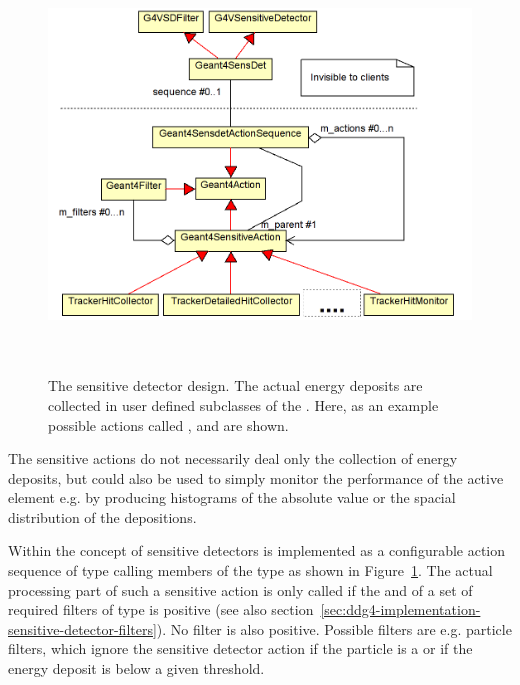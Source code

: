\documentclass[10pt,a4paper]{article}
\begin{document}
\begin{figure}[t]
  \begin{center}
    \includegraphics[height=110mm] {DDG4-Sensitive-detector.png}
    \caption{The sensitive detector design. The actual energy deposits are 
        collected in user defined subclasses of the .
        Here, as an example possible actions called ,
         and  are shown.}
    \label{fig:ddg4-implementation-sensitive-detector}
  \end{center}
\end{figure}

\noindent
The sensitive actions do not necessarily deal only the collection of energy 
deposits, but could also be used to simply monitor the performance of the
active element e.g. by producing histograms of the absolute value or the 
spacial distribution of the depositions.

\noindent
Within \DDG the concept of sensitive  detectors is implemented as a
configurable  action sequence of type 
{}
calling members of the type 
{} as shown in 
Figure~\ref{fig:ddg4-implementation-sensitive-detector}. The actual processing
part of such a sensitive action is only called if the and of a set of
required filters of type  is positive (see also 
section~\ref{sec:ddg4-implementation-sensitive-detector-filters}). No filter 
is also positive. Possible filters are e.g. particle filters, which ignore the
sensitive detector action if the particle is a  or if the
energy deposit is below a given threshold.
\end{document}
